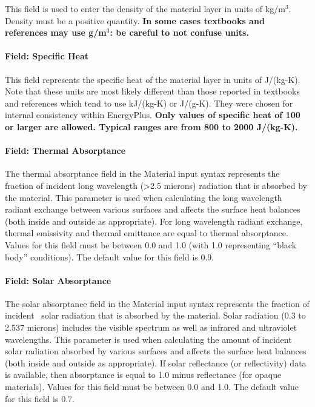This field is used to enter the density of the material layer in units of kg/m\(^{3}\). Density must be a positive quantity. \textbf{In some cases textbooks and references may use g/m\(^{3}\): be careful to not confuse units.}

\paragraph{Field: Specific Heat}\label{field-specific-heat}

This field represents the specific heat of the material layer in units of J/(kg-K). Note that these units are most likely different than those reported in textbooks and references which tend to use kJ/(kg-K) or J/(g-K). They were chosen for internal consistency within EnergyPlus. \textbf{Only values of specific heat of 100 or larger are allowed. Typical ranges are from 800 to 2000 J/(kg-K).}

\paragraph{Field: Thermal Absorptance}\label{field-thermal-absorptance}

The thermal absorptance field in the Material input syntax represents the fraction of incident long wavelength (>2.5 microns) radiation that is absorbed by the material. This parameter is used when calculating the long wavelength radiant exchange between various surfaces and affects the surface heat balances (both inside and outside as appropriate). For long wavelength radiant exchange, thermal emissivity and thermal emittance are equal to thermal absorptance. Values for this field must be between 0.0 and 1.0 (with 1.0 representing ``black body'' conditions). The default value for this field is 0.9.

\paragraph{Field: Solar Absorptance}\label{field-solar-absorptance}

The solar absorptance field in the Material input syntax represents the fraction of incident~ solar radiation that is absorbed by the material. Solar radiation (0.3 to 2.537 microns) includes the visible spectrum as well as infrared and ultraviolet wavelengths. This parameter is used when calculating the amount of incident solar radiation absorbed by various surfaces and affects the surface heat balances (both inside and outside as appropriate). If solar reflectance (or reflectivity) data is available, then absorptance is equal to 1.0 minus reflectance (for opaque materials). Values for this field must be between 0.0 and 1.0. The default value for this field is 0.7.

